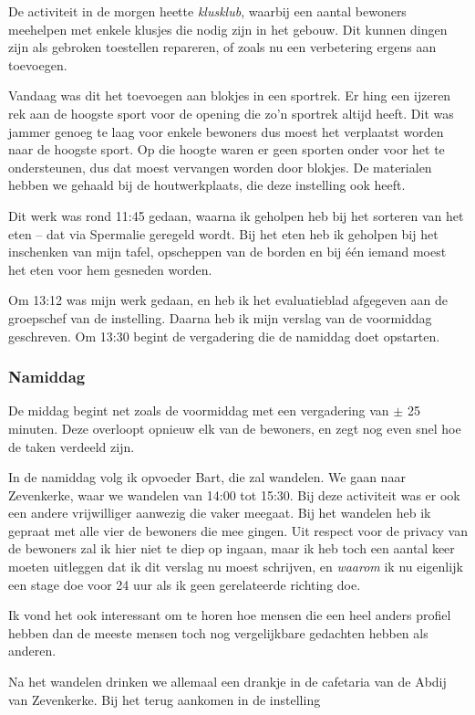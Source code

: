 \documentclass[a4paper,12pt]{article}
\begin{document}
De activiteit in de morgen heette \emph{klusklub}, waarbij een aantal bewoners meehelpen met enkele klusjes die nodig zijn in het gebouw. Dit kunnen dingen zijn als gebroken toestellen repareren, of zoals nu een verbetering ergens aan toevoegen.

Vandaag was dit het toevoegen aan blokjes in een sportrek. Er hing een ijzeren rek aan de hoogste sport voor de opening die zo'n sportrek altijd heeft. Dit was jammer genoeg te laag voor enkele bewoners dus moest het verplaatst worden naar de hoogste sport. Op die hoogte waren er geen sporten onder voor het te ondersteunen, dus dat moest vervangen worden door blokjes. De materialen hebben we gehaald bij de houtwerkplaats, die deze instelling ook heeft.

Dit werk was rond 11:45 gedaan, waarna ik geholpen heb bij het sorteren van het eten -- dat via Spermalie geregeld wordt. Bij het eten heb ik geholpen bij het inschenken van mijn tafel, opscheppen van de borden en bij één iemand moest het eten voor hem gesneden worden.

Om 13:12 was mijn werk gedaan, en heb ik het evaluatieblad afgegeven aan de groepschef van de instelling. Daarna heb ik mijn verslag van de voormiddag geschreven. Om 13:30 begint de vergadering die de namiddag doet opstarten.

\subsubsection{Namiddag}

De middag begint net zoals de voormiddag met een vergadering van $\pm$ 25 minuten. Deze overloopt opnieuw elk van de bewoners, en zegt nog even snel hoe de taken verdeeld zijn.

In de namiddag volg ik opvoeder Bart, die zal wandelen. We gaan naar Zevenkerke, waar we wandelen van 14:00 tot 15:30. Bij deze activiteit was er ook een andere vrijwilliger aanwezig die vaker meegaat. Bij het wandelen heb ik gepraat met alle vier de bewoners die mee gingen. Uit respect voor de privacy van de bewoners zal ik hier niet te diep op ingaan, maar ik heb toch een aantal keer moeten uitleggen dat ik dit verslag nu moest schrijven, en \emph{waarom} ik nu eigenlijk een stage doe voor 24 uur als ik geen gerelateerde richting doe.

Ik vond het ook interessant om te horen hoe mensen die een heel anders profiel hebben dan de meeste mensen toch nog vergelijkbare gedachten hebben als anderen.

Na het wandelen drinken we allemaal een drankje in de cafetaria van de Abdij van Zevenkerke. Bij het terug aankomen in de instelling
\end{document}
